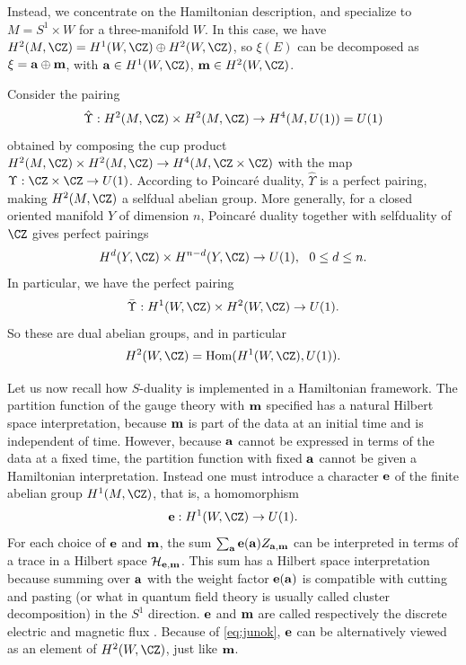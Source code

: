 Instead, we concentrate on the Hamiltonian description, and
specialize to $M=S^1\times W$ for a three-manifold $W$. In this
case, we have $H^2(M,\CZ)=H^1(W,\CZ)\oplus H^2(W,\CZ)$, so
$\xi(E)$ can be decomposed as $\xi={\bf a}\oplus {\bf m}$, with
${\bf a}\in H^1(W,\CZ)$, ${\bf m}\in H^2(W,\CZ)$.

Consider the pairing %
\setcounter{equation}{2}
\begin{equation}\label{eq:junko}
\hat \Upsilon:H^2(M,\CZ)\times
H^2(M,\CZ)\to H^4(M,U(1))=U(1)
\end{equation}
 obtained by composing the cup
product $H^2(M,\CZ)\times H^2(M,\CZ)\to H^4(M,\CZ\times\CZ)$ with
the map $\Upsilon:\CZ\times\CZ\to U(1)$. According to Poincar\'e
duality, $\hat\Upsilon$ is a perfect pairing, making $H^2(M,\CZ)$
a selfdual abelian group. More generally, for a closed oriented
manifold $Y$ of dimension $n$, Poincar\'e duality together with
selfduality of $\CZ$ gives perfect pairings
\setcounter{equation}{3}
\begin{equation}\label{eq:unko}
H^d(Y,\CZ)\times H^{n-d}(Y,\CZ)\to U(1), ~~0\leq d\leq
n.
\end{equation}
 In particular, we have the perfect pairing
\setcounter{equation}{4}
\begin{equation}\label{eq:normo}
\bar\Upsilon:H^1(W,\CZ)\times H^2(W,\CZ)\to U(1).
\end{equation}
 So
these are dual abelian groups, and in particular
\setcounter{equation}{5}
\begin{equation}\label{eq:junok}
H^2(W,\CZ)={\rm Hom}(H^1(W,\CZ),U(1)).
\end{equation}

Let us now recall how $S$-duality is implemented in a Hamiltonian
framework. The partition function of the gauge theory with ${\bf
m}$ specified has a natural Hilbert space interpretation, because
${\bf m}$ is part of the data at an initial time and is
independent of time. However, because ${\bf a}$ cannot be
expressed in terms of the data at a fixed time, the partition
function with fixed ${\bf a}$ cannot be given a Hamiltonian
interpretation.  Instead  one must introduce a character ${\bf e}$
of the finite abelian group $H^1(M,\CZ)$, that is, a homomorphism
\setcounter{equation}{6}
\begin{equation}\label{eq:kilno}
{\bf e}:H^1(W,\CZ)\to U(1).
\end{equation}
 For each choice of ${\bf
e}$ and ${\bf m}$, the sum $\sum_{{\bf a}}{\bf e}({\bf a})Z_{{\bf
a},{\bf m}}$ can be interpreted in terms of a trace in a Hilbert
space ${\cal H}_{{\bf e},{\bf m}}$. This sum has a Hilbert space
interpretation because summing over ${\bf a}$ with the weight
factor ${\bf e}({\bf a})$ is compatible with cutting and pasting
(or what  in quantum field theory is usually called cluster
decomposition) in the $S^1$ direction. ${\bf e}$ and ${\bf m}$ are
called respectively the discrete electric and magnetic flux
\cite{ref101}. Because of \eqref{eq:junok}, $\bf e$ can be alternatively viewed as
an element of $H^2(W,\CZ)$, just like $\bf m$.

